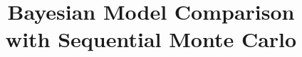 \def\inthesis{}

\title{Bayesian Model Comparison \\with Sequential Monte Carlo}



\frontmatter
\maketitle
\tableofcontents

\mainmatter










\backmatter
\printbibliography


